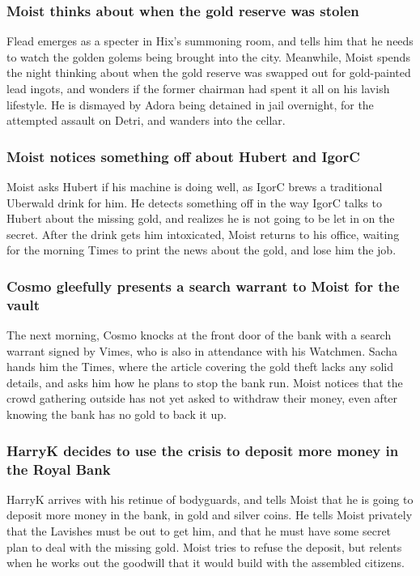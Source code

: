 \subsubsection{\Gls{Moist} thinks about when the gold reserve was stolen}
\Gls{Flead} emerges as a specter in \Gls{Hix}'s summoning room, and tells him that he needs to
watch the golden golems being brought into the city. Meanwhile, \Gls{Moist} spends the night
thinking about when the gold reserve was swapped out for gold-painted lead ingots, and wonders if
the former chairman had spent it all on his lavish lifestyle. He is dismayed by \Gls{Adora} being
detained in jail overnight, for the attempted assault on \Gls{Detri}, and wanders into the cellar.

\subsubsection{\Gls{Moist} notices something off about \Gls{Hubert} and \Gls{IgorC}}
\Gls{Moist} asks \Gls{Hubert} if his machine is doing well, as \Gls{IgorC} brews a traditional
Uberwald drink for him. He detects something off in the way \Gls{IgorC} talks to \Gls{Hubert} about
the missing gold, and realizes he is not going to be let in on the secret. After the drink gets him
intoxicated, \Gls{Moist} returns to his office, waiting for the morning Times to print the news
about the gold, and lose him the job.

\subsubsection{\Gls{Cosmo} gleefully presents a search warrant to \Gls{Moist} for the vault}
The next morning, \Gls{Cosmo} knocks at the front door of the bank with a search warrant signed
by \Gls{Vimes}, who is also in attendance with his Watchmen. \Gls{Sacha} hands him the Times, where
the article covering the gold theft lacks any solid details, and asks him how he plans to stop the
bank run. \Gls{Moist} notices that the crowd gathering outside has not yet asked to withdraw their
money, even after knowing the bank has no gold to back it up.

\subsubsection{\Gls{HarryK} decides to use the crisis to deposit more money in the Royal Bank}
\Gls{HarryK} arrives with his retinue of bodyguards, and tells \Gls{Moist} that he is going to
deposit more money in the bank, in gold and silver coins. He tells \Gls{Moist} privately that the
Lavishes must be out to get him, and that he must have some secret plan to deal with the missing
gold. \Gls{Moist} tries to refuse the deposit, but relents when he works out the goodwill that it
would build with the assembled citizens.

